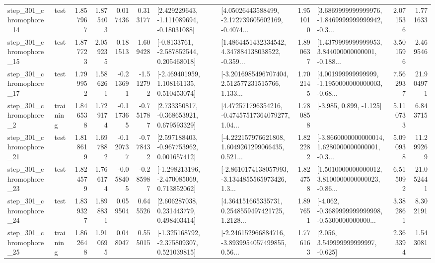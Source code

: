 \begin{tabular}{llrrrrllrlrr}
  step\_301\_chromophore\_14 &      test &      1.857967 &    1.875403 &      0.017436 &  0.313177 &    [2.429229643, -1.111089694, -0.18031088] &  [4.05026443588499, -2.172739605602169, -0.4074... &       1.951010 &  [3.6869999999999976, -1.8469999999999942, -0.3... &            2.071536 &          1.771633 \\
  step\_301\_chromophore\_15 &      test &      1.877723 &    2.059235 &      0.181513 &  1.609428 &     [-0.8133761, -2.587852544, 0.205468018] &  [1.4864451432334542, 4.347884138038522, -0.359... &       1.890637 &  [1.4379999999999953, 3.844000000000001, -0.188... &            3.501596 &          2.469546 \\
  step\_301\_chromophore\_17 &      test &      1.799952 &    1.586261 &     -0.213691 & -1.512792 &    [-2.469401959, 1.108161135, 0.510453074] &  [-3.2016985496707404, 2.512577231515766, 1.133... &       1.702145 &  [4.001999999999999, -1.1950000000000003, -0.68... &            7.562937 &         21.904971 \\
   step\_301\_chromophore\_2 &  training &      1.846538 &    1.729174 &     -0.117365 & -0.751787 &    [2.733350817, -0.368653921, 0.679593329] &  [4.472571796354216, -0.47457517364079277, 1.04... &       1.780858 &                            [-3.985, 0.899, -1.125] &            5.110733 &          6.843715 \\
  step\_301\_chromophore\_21 &      test &      1.818619 &    1.697882 &     -0.120737 & -0.778432 &    [2.597188403, -0.967753962, 0.001657412] &  [-4.222157976621808, 1.6049261299066435, 0.521... &       1.822282 &  [-3.8660000000000014, 1.6280000000000001, -0.3... &            5.090938 &         11.299269 \\
  step\_301\_chromophore\_23 &      test &      1.824579 &    1.766174 &     -0.058405 & -0.285987 &   [-1.298213196, -2.470085069, 0.713852062] &  [-2.8610174138057993, -3.1344855565973426, 1.3... &       1.824758 &  [1.5010000000000012, 3.8100000000000023, -0.86... &            6.515092 &         21.052441 \\
  step\_301\_chromophore\_24 &      test &      1.839327 &    1.898831 &      0.059504 &  0.645526 &     [2.606287038, 0.231443779, 0.498403414] &  [4.364151665335731, 0.2548559497421725, 1.2128... &       1.897651 &  [-4.062, -0.3689999999999998, -0.5300000000000... &            3.382861 &          8.302191 \\
  step\_301\_chromophore\_25 &  training &      1.862648 &    1.910695 &      0.048047 &  0.555015 &   [-1.325168792, -2.375809307, 0.521039815] &  [-2.246152966884716, -3.8939954057499855, 0.56... &       1.776163 &                 [2.056, 3.549999999999997, -0.625] &            2.363394 &          1.543081 \\

\end{tabular}
